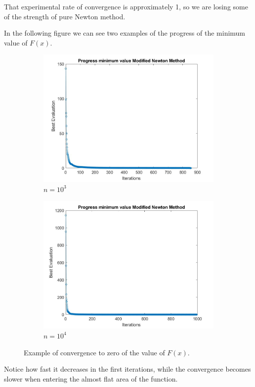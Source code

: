 That experimental rate of convergence is approximately 1, so we are losing some of the strength of pure Newton method. 

In the following figure we can see two examples of the progress of the minimum value of $F(x)$.
\begin{figure}[htbp]
    \centering
    \begin{subfigure}[t]{0.45\textwidth}  %
        \centering
        \includegraphics[width=\textwidth]{img/pb75_1e3_MN_convergence.jpg}
        \caption{$n=10^3$}
    \end{subfigure}
    \hspace{1cm} %
    \begin{subfigure}[t]{0.45\textwidth}
        \centering
        \includegraphics[width=\textwidth]{img/pb75_1e4_MN_convergence.jpg}
        \caption{$n=10^4$}
    \end{subfigure}
    \caption{Example of convergence to zero of the value of $F(x)$.}
    \label{convergenze MN 75}
\end{figure}
Notice how fast it decreases in the first iterations, while the convergence becomes slower when entering the almost flat area of the function.

